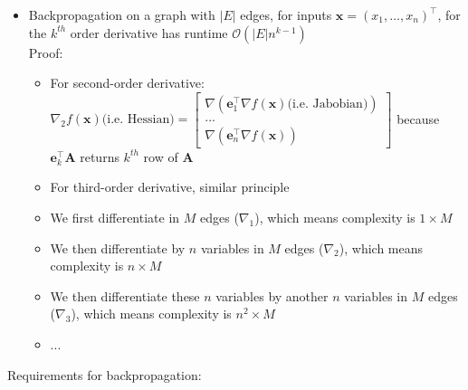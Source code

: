 \begin{itemize}
    \item Backpropagation on a graph with $|E|$ edges, for inputs $\boldsymbol{x} = (x_1, \dots, x_n)^\intercal$, for the $k^{th}$ order derivative has runtime $\mathcal{O}(|E|n^{k-1})$\\
    Proof:
    \begin{itemize}
        \item For second-order derivative: $
        \nabla_2 f(\boldsymbol{x}) \textrm{(i.e. Hessian)} = 
        \begin{bmatrix}
        \nabla( \boldsymbol{e}_1^\intercal \nabla f(\boldsymbol{x}) \textrm{(i.e. Jabobian)})\\
        ...\\
        \nabla( \boldsymbol{e}_n^\intercal \nabla f(\boldsymbol{x}))
        \end{bmatrix}
        $ because $\boldsymbol{e}_k^\intercal \boldsymbol{A}$ returns $k^{th}$ row of $\boldsymbol{A}$
        \item For third-order derivative, similar principle
        \item We first differentiate in $M$ edges ($\nabla_1$), which means complexity is $1 \times M$
        \item We then differentiate by $n$ variables in $M$ edges ($\nabla_2$), which means complexity is $n \times M$
        \item We then differentiate these $n$ variables by another $n$ variables in $M$ edges ($\nabla_3$), which means complexity is $n^2 \times M$
        \item $...$
    \end{itemize}
\end{itemize}
Requirements for backpropagation:
